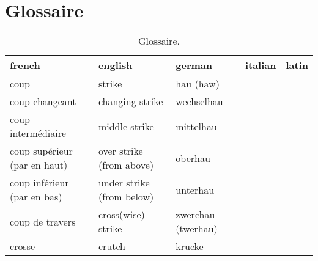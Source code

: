\chapter{Glossaire}

\begin{table}[h]
	\begin{adjustwidth}{-1cm}{-1cm}
	\centering
	\begin{tabular}{lllll}
		french &
			english &
			german &
			italian &
			latin \\
		\hline
		coup &
			strike &
			hau (haw) &
			&
			\\
		coup changeant &
			changing strike &
			wechselhau &
			&
			\\
		coup intermédiaire &
			middle strike &
			mittelhau &
			&
			\\
		coup supérieur (par en haut) &
			over strike (from above) &
			oberhau &
			&
			\\
		coup inférieur (par en bas) &
			under strike (from below) &
			unterhau &
			&
			\\
		coup de travers &
			cross(wise) strike &
			zwerchau (twerhau) &
			&
			\\
		crosse &
		crutch &
		krucke &
		&
	\end{tabular}
	\caption{Glossaire.}
	\end{adjustwidth}
\end{table}



